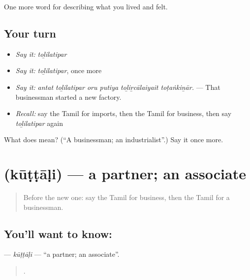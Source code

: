 \begin{grammarlens}[title={What you've built}]
One more word for describing what you lived and felt.
\end{grammarlens}

\subsection*{Your turn}
\begin{itemize}
\raggedright
  \item \emph{Say it:} \emph{toḻilatipar}
  \item \emph{Say it:} \emph{toḻilatipar}, once more
  \item \emph{Say it:} \emph{antat toḻilatipar oru putiya toḻiṟcālaiyait toṭaṅkiṉār.} — That businessman started a new factory.
  \item \emph{Recall:} say the Tamil for imports, then the Tamil for business, then say \emph{toḻilatipar} again
\end{itemize}

\begin{tcolorbox}[breakable,colback=teal!4,colframe=teal!35!black,title={Before you move on}]
What does  mean? (\textquotedblleft{}A businessman; an industrialist\textquotedblright{}.) Say it once more.
\end{tcolorbox}
\section[\texorpdfstring{\ta{கூட்டாளி} (kūṭṭāḷi)}{கூட்டாளி (kūṭṭāḷi)}]{ (kūṭṭāḷi) — a partner; an associate}

\label{lesson:TA-C511-kuttali}



\begin{quote}
Before the new one: say the Tamil for business, then the Tamil for a businessman.
\end{quote}

\subsection*{You'll want to know: }
\textbf{} — \emph{kūṭṭāḷi} — \textquotedblleft{}a partner; an associate\textquotedblright{}.

\begin{quote}
      .
\end{quote}

